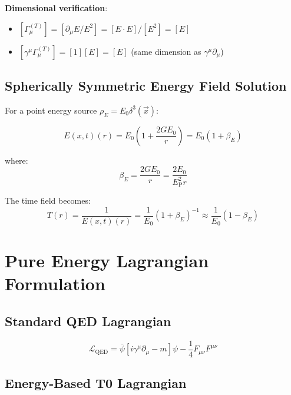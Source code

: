 \documentclass[12pt,a4paper]{article}
\newcommand{\checked}{\checkmark}
\newcommand{\Efield}{E(x,t)}
\newcommand{\vecx}{\vec{x}}
\newcommand{\EP}{E_{\text{P}}}
\newcommand{\GammaT}{\Gamma_{\mu}^{(T)}}
\begin{document}
	\textbf{Dimensional verification}:
	\begin{itemize}
		\item $[\GammaT] = [\partial_{\mu} E/E^2] = [E \cdot E]/[E^2] = [E]$
		\item $[\gamma^{\mu} \GammaT] = [1][E] = [E]$ (same dimension as $\gamma^{\mu}\partial_{\mu}$) \checked
	\end{itemize}
	
	\subsection{Spherically Symmetric Energy Field Solution}
	\label{subsec:spherical_energy_solution}
	
	For a point energy source $\rho_E = E_0 \delta^3(\vecx)$:
	
	\begin{equation}
		\Efield(r) = E_0\left(1 + \frac{2GE_0}{r}\right) = E_0(1 + \beta_E)
		\label{eq:spherical_energy_solution}
	\end{equation}
	
	where:
	\begin{equation}
		\beta_E = \frac{2GE_0}{r} = \frac{2E_0}{\EP^2 r}
		\label{eq:beta_energy}
	\end{equation}
	
	The time field becomes:
	\begin{equation}
		T(r) = \frac{1}{\Efield(r)} = \frac{1}{E_0}(1 + \beta_E)^{-1} \approx \frac{1}{E_0}(1 - \beta_E)
		\label{eq:time_from_energy}
	\end{equation}
	
	\section{Pure Energy Lagrangian Formulation}
	\label{sec:energy_lagrangian}
	
	\subsection{Standard QED Lagrangian}
	\label{subsec:standard_qed_lagrangian}
	
	\begin{equation}
		\mathcal{L}_{\text{QED}} = \bar{\psi}[i\gamma^{\mu}\partial_{\mu} - m]\psi - \frac{1}{4}F_{\mu\nu}F^{\mu\nu}
		\label{eq:standard_qed_lagrangian}
	\end{equation}
	
	\subsection{Energy-Based T0 Lagrangian}
	\label{subsec:energy_t0_lagrangian}
	
\end{document}

